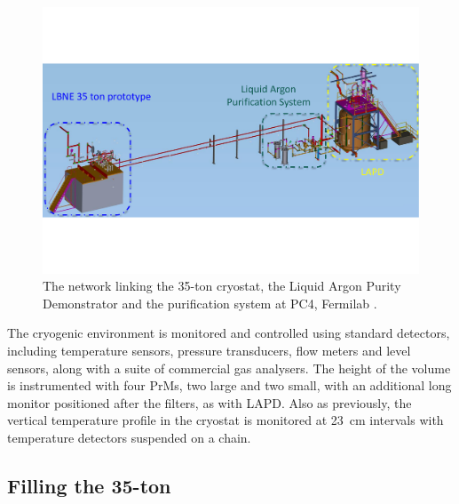 \begin{figure}
  \centering
  \includegraphics[width=14cm]{35tonLAPD.pdf}
  \caption[The network linking the 35-ton cryostat, the Liquid Argon Purity Demonstrator and the purification system at PC4, Fermilab.]{The network linking the 35-ton cryostat, the Liquid Argon Purity Demonstrator and the purification system at PC4, Fermilab \cite{35tonPhaseI2014}.}
  \label{fig:35tonLAPD}
\end{figure}

The cryogenic environment is monitored and controlled using standard detectors, including temperature sensors, pressure transducers, flow meters and level sensors, along with a suite of commercial gas analysers.  The height of the volume is instrumented with four PrMs, two large and two small, with an additional long monitor positioned after the filters, as with LAPD.  Also as previously, the vertical temperature profile in the cryostat is monitored at 23~cm intervals with temperature detectors suspended on a chain.

\subsection{Filling the 35-ton}\label{sec:35tonFilling}


